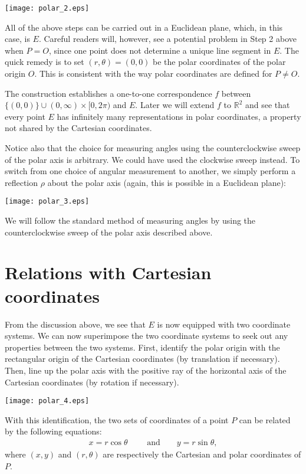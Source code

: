 \documentclass[12pt]{article}
\begin{document}
\begin{center}
\texttt{[image: polar\_2.eps]}
\end{center}
All of the above steps can be carried out in a Euclidean plane,
which, in this case, is $E$. Careful readers will, however, see a
potential problem in Step 2 above when $P=O$, since one point does
not determine a unique line segment in $E$. The quick remedy is to
set $(r,\theta)=(0,0)$ be the polar coordinates of the polar origin
$O$. This is consistent with the way polar coordinates are defined
for $P\neq O$.

The construction establishes a one-to-one correspondence $f$ between
$\lbrace (0,0)\rbrace \cup (0,\infty)\times[0,2\pi)$ and $E$. Later
we will extend $f$ to $\mathbb{R}^2$ and see that every point $E$
has infinitely many representations in polar coordinates, a property
not shared by the Cartesian coordinates.

Notice also that the choice for measuring angles using the
counterclockwise sweep of the polar axis is arbitrary. We could have
used the clockwise sweep instead. To switch from one choice of
angular measurement to another, we simply perform a reflection
$\rho$ about the polar axis (again, this is possible in a Euclidean
plane):
\begin{center}
\texttt{[image: polar\_3.eps]}
\end{center}
We will follow the standard method of measuring angles by using the
counterclockwise sweep of the polar axis described above.

\section{Relations with Cartesian coordinates}
From the discussion above, we see that $E$ is now equipped with two
coordinate systems. We can now superimpose the two coordinate
systems to seek out any properties between the two systems. First,
identify the polar origin with the rectangular origin of the
Cartesian coordinates (by translation if necessary). Then, line up
the polar axis with the positive ray of the horizontal axis of the
Cartesian coordinates (by rotation if necessary).
\begin{center}
\texttt{[image: polar\_4.eps]}
\end{center}
With this identification, the two sets of coordinates of a point $P$
can be related by the following equations:
\begin{eqnarray}
x=r\cos\theta\qquad \mbox{ and}\qquad y=r\sin\theta,
\end{eqnarray}
where $(x,y)$ and $(r,\theta)$ are respectively the Cartesian and
polar coordinates of $P$.
\end{document}
